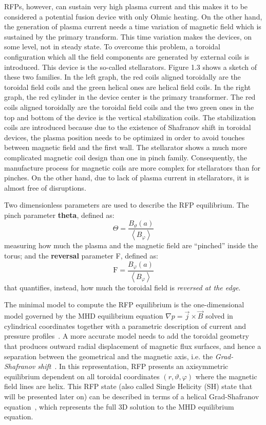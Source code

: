 RFPs, however, can sustain very high plasma current and this makes it to be considered a potential fusion device with only Ohmic heating. On the other hand, the generation of plasma current needs a time variation of magnetic field which is sustained by the primary transform. This time variation makes the devices, on some level, not in steady state. To overcome this problem, a toroidal configuration which all the field components are generated by external coils is introduced. This device is the so-called stellarators. Figure 1.3 shows a sketch of these two families. In the left graph, the red coils aligned toroidally are the toroidal field coils and the green helical ones are helical field coils. In the right graph, the red cylinder in the device center is the primary transformer. The red coils aligned toroidally are the toroidal field coils and the two green ones in the top and bottom of the device is the vertical stabilization coils. The stabilization coils are introduced because due to the existence of Shafranov shift in toroidal devices, the plasma position needs to be optimized in order to avoid touches between magnetic field and the first wall. 
The stellarator shows a much more complicated magnetic coil design than one in pinch family. Consequently, the manufacture process for magnetic coils are more complex for stellarators than for pinches. On the other hand, due to lack of plasma current in stellarators, it is almost free of disruptions.

Two dimensionless parameters are used to describe the RFP equilibrium. 
The pinch parameter \textbf{theta}, defined as:
\begin{equation}
    \Theta = \frac{B_\vartheta (a)}{ \left\langle B_\varphi \right\rangle }
\end{equation}
measuring how much the plasma and the magnetic field are “pinched” inside the torus; and the \textbf{reversal} parameter F, defined as:
\begin{equation}
    \mathrm{F} = \frac{B_\varphi(a)}{ \left\langle B_\varphi \right\rangle }
\end{equation}
that quantifies, instead, how much the toroidal field is \emph{reversed at the edge}.

The minimal model to compute the RFP equilibrium is the one-dimensional model governed by the MHD equilibrium equation $\nabla p = \Vec{j} \times \Vec{B}$ solved in cylindrical coordinates together with a parametric description of current and pressure profiles~\cite{Bonomo33}.
A more accurate model needs to add the toroidal geometry that produces outward radial displacement of magnetic flux surfaces, and hence a separation between the geometrical and the magnetic axis, i.e. the \textit{Grad-Shafranov shift}~\cite{Bonomo30}. 
In this representation, RFP presents an axisymmetric equilibrium dependent on all toroidal coordinates $(r, \vartheta, \varphi)$  where the magnetic field lines are helix. This RFP state (also called Single Helicity (SH) state that will be presented later on) can be described in terms of a helical Grad-Shafranov equation~\cite{Bonomo35, Bonomo36}, which represents the full 3D solution to the MHD equilibrium equation.



